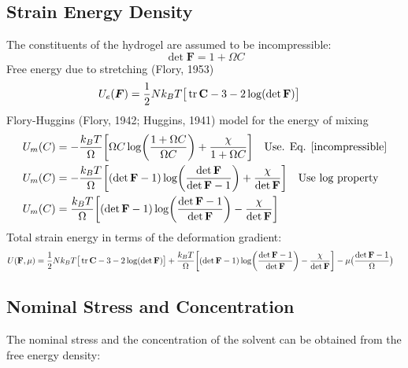 \documentclass[12pt,3p]{article}
\numberwithin{equation}{section}
\begin{document}
\subsection{Strain Energy Density}
The constituents of the hydrogel are assumed to be incompressible: 
\begin{equation}\label{incompressible}
\det \mathbf{F} = 1 + \Omega C 
\end{equation}
Free energy due to stretching (Flory, 1953)
\begin{align}\label{Stretch}
\begin{split}
U_e (\boldsymbol{F}) &=  \frac{1}{2} N k_B T \big[ \tr \mathbf{C} - 3 - 2 \log (\det \mathbf{F}) \big] 
\end{split}
\end{align}
Flory-Huggins (Flory, 1942; Huggins, 1941) model for the energy of mixing 
\begin{align}\label{Mix}
\begin{split}
U_m(C) &= - \frac{k_B T}{\Omega} \bigg[ \Omega C \log(\frac{1 + \Omega C}{\Omega C}) + \frac{\chi}{1 + \Omega C} \bigg] \quad \text{Use. Eq. \ref{incompressible}} \\
U_m(C) &= - \frac{k_B T}{\Omega} \bigg[ (\det \mathbf{F} - 1) \log(\frac{\det \mathbf{F}}{\det \mathbf{F} - 1}) + \frac{\chi}{\det \mathbf{F}} \bigg] \quad \text{Use log property}\\
U_m(C) &= \frac{k_B T}{\Omega} \bigg[ (\det \mathbf{F} - 1) \log (\frac{\det \mathbf{F} - 1}{\det \mathbf{F}}) - \frac{\chi}{\det \mathbf{F}} \bigg] 
\end{split}
\end{align}
Total strain energy in terms of the deformation gradient: 
\begin{align*}
U (\mathbf{F}, \mu) &= \frac{1}{2} N k_B T \big[ \tr \mathbf{C} - 3 - 2 \log (\det \mathbf{F}) \big] + \frac{k_B T}{\Omega} \bigg[ (\det \mathbf{F} - 1) \log (\frac{\det \mathbf{F} - 1}{\det \mathbf{F}}) - \frac{\chi}{\det \mathbf{F}} \bigg] - \mu \big(\frac{\det \mathbf{F} - 1}{\Omega} \big)
\end{align*}

\subsection{Nominal Stress and Concentration}
The nominal stress and the concentration of the solvent can be obtained from the free energy density: 
\end{document}
